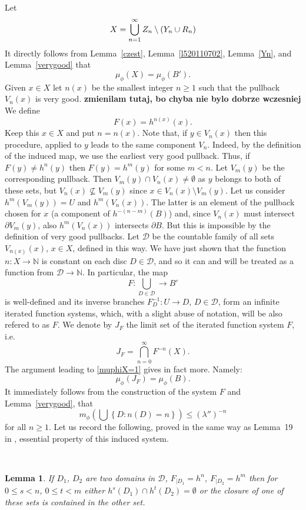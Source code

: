 \documentclass[12pt]{amsart}
\numberwithin{equation}{section}
\newcommand{\beq}{\begin{equation}}
\newcommand{\eeq}{\end{equation}}
\newcommand{\nl}{\newline}
\newtheorem{lem}[thm]{Lemma}
\def\N{{\mathbb N}}            \def\Z{{\mathbb Z}}      \def\R{{\mathbb R}}
\def\bi{\bigcap}              \def\bu{\bigcup}
\def\lt{\left}                \def\rt{\right}
\def\sp{\medskip}             \def\fr{\noindent}        \def\nl{\newline}
\newcommand{\lam}{\lambda}
\begin{document}
\sp\fr Let 
$$
X=\bu_{n=1}^\infty Z_n\sms(Y_n\cup R_n)
$$
It directly follows from Lemma~\ref{czest}, Lemma~\ref{l520110702},
Lemma~\ref{Yn}, and Lemma~\ref{verygood} that 
\beq\label{muphiX=1}
\mu_\phi(X)=\mu_\phi(B').
\eeq
Given $x\in X$ let $n(x)$ be the smallest integer $n\ge 1$ such that
the pullback $V_n(x)$ is very good.
{\bf zmienilam tutaj, bo chyba nie bylo dobrze wczesniej}
We define
$$
F(x)=h^{n(x)}(x).
$$ 
Keep this $x\in X$ and put $n=n(x)$. Note that, if $y\in V_n(x)$
then this procedure, applied to $y$ leads to the same component
$V_n$. 
Indeed, by the definition of the induced map, we use the earliest very
good pullback. Thus, if $F(y)\neq h^n(y)$ then $F(y)=h^m(y)$ for some
$m<n$. Let $V_m(y)$ be the corresponding pullback. Then $V_m(y)\cap
V_n(x)\neq\emptyset$ as $y$ belongs to both of these sets, but
$V_n(x)\nsubseteq V_m(y)$ since $x\in V_n(x)\setminus V_m(y)$.  
 Let us consider $h^m( V_m(y))=U$ and $h^m(V_n(x))$. The latter is
an element of the pullback chosen for $x$ (a component of
$h^{-(n-m)}(B)$) and, since  $V_n(x)$ must intersect $\partial V_m(y)$, 
also $h^m(V_n(x))$ intersects $\partial B$. But this is impossible by
the definition of very good pullbacks. Let $\mathcal D$ 
be the countable family of all sets $V_{n(x)}(x)$, $x\in X$, defined in this
way. We have just shown that the function $n:X\to\N$ is constant on
each disc $D\in \mathcal D$, and so it can and will be treated as a
function from $\mathcal D\to\N$. In particular, the map  
$$
F:\bigcup_{D\in\mathcal D}\to B'
$$
is well-defined and its inverse branches $F_D^{-1}:U\to D$,
$D\in\mathcal D$, form an infinite iterated function
systems, which, with a slight abuse of notation, will be also refered
to as $F$. We denote by $J_F$ the limit set of the iterated function
system $F$, i.e.
\beq\label{limisetIFS}
J_F=\bi_{n=0}^\infty F^{-n}(X).
\eeq
The argument leading to \eqref{muphiX=1} gives in fact more. Namely:
\beq\label{fullmeasurelimisetIFS}
\mu_\phi(J_F)=\mu_\phi(B).
\eeq    
It immediately follows from the construction of the system $F$ and
Lemma~\ref{verygood}, that
\begin{equation}\label{expdecay20110622}
m_\phi\lt(\bu\lt\{D:n(D)=n\rt\}\rt)\le (\lam'')^{-n}
\end{equation}
for all $n\ge 1$.
Let us record the following, proved in the same way as Lemma~19 in
\cite{SUZ1}, essential property of this induced system. 

\

\begin{lem}
If $D_1$, $D_2$ are two domains in $\mathcal D$, $F_{|D_1}=h^n$,
$F_{|D_2}=h^m$ then for $0\le s< n$, $0\le t< m$ either ${h^s(D_1)}\cap
{h^t(D_2)}=\emptyset$ or the closure of one 
of these sets is contained in the other set. 
\end{lem}
\end{document}
